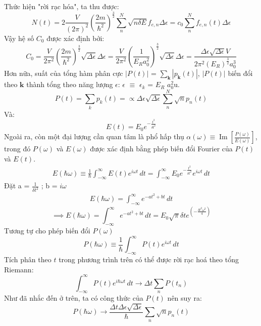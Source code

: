 \documentclass[14Pt]{article}
\begin{document}
	Thức hiện "rời rạc hóa", ta thu được:
	\begin{equation*}
		N(t) = 2 \frac{V}{(2\pi)^2} (\frac{2m}{\hbar^2})^\frac{3}{2} \sum_n^N \sqrt{n\delta E} f_{e,n} \Delta \epsilon
		= c_0 \sum_n^N f_{e,n}(t) \Delta \epsilon
	\end{equation*}
	Vậy hệ số $C_0$ được xác định bởi:
	\begin{equation}
		C_0 = \frac{V}{2\pi^2} (\frac{2m}{\hbar^2})^\frac{3}{2} \sqrt{\Delta \epsilon} \Delta \epsilon
		= \frac{V}{2\pi^2} (\frac{1}{E_R a_0^2})^\frac{3}{2}  \sqrt{\Delta \epsilon} \Delta \epsilon
		= \frac{\Delta \epsilon \sqrt{\Delta \epsilon}V}{2\pi^2 (E_R)^\frac{3}{2} a_0^3}
	\end{equation}
	Hơn nữa, suất của tổng hàm phân cực $\left| P(t) \right|$ = $\sum_\mathbf{k}$$\left| p_\mathbf{k}(t)\right|$, $\left| P(t) \right|$ biến đổi theo $\mathbf{k}$ thành tổng theo năng lượng $\epsilon$: $\epsilon$ $\equiv$ $\epsilon_k$ = $E_R$ $a_0^2$u.
	\begin{equation}
		P(t) = \sum_k p_k(t) = \propto \Delta \epsilon \sqrt{\Delta \epsilon} \sum_n^N \sqrt{n} p_n(t)
	\end{equation}
	Và:
	\begin{equation}
		E(t) = E_0 e^{-\frac{t^2}{\delta t^2}}
	\end{equation}
	Ngoài ra, còn một đại lượng cần quan tâm là phổ hấp thụ \( \alpha(\omega) \equiv \operatorname{Im} \left[\frac{P(\omega)}{E(\omega)}\right] \), trong đó \( P(\omega) \) và \( E(\omega) \) được xác định bằng phép biến đổi Fourier của \( P(t) \) và \( E(t) \).
	\begin{equation*}
		\begin{aligned}
		E(\hbar \omega) \equiv \frac{1}{\hbar}\int_{-\infty}^{\infty} E(t) e^{i\omega t} \, dt = \int_{-\infty}^{\infty}  E_0 e^{-\frac{t^2}{\delta t^2}} e^{i\omega t} \, dt
		\end{aligned}
	\end{equation*}
	Đặt a = $\frac{1}{\delta t^2}$ ; b = $i\omega$
	\begin{align*}
			E(\hbar \omega) = \int_{-\infty}^{\infty} e^{-at^2 + bt} \, dt
	\end{align*}
	\begin{equation}
	\implies E(\hbar \omega) = \int_{-\infty}^{\infty} e^{-at^2 + bt} \, dt = E_0 \sqrt{\pi} \delta t e^{\left( -\frac{\delta t^2 \omega^2}{4} \right)}
	\end{equation}
	Tương tự cho phép biến đổi $P(\omega)$
	\begin{equation}
		P(\hbar \omega) \equiv \frac{1}{\hbar}\int_{-\infty}^{\infty} P(t) e^{i\omega t} \, dt
	\end{equation}
	Tích phân theo $t$ trong phương trình trên có thể được rời rạc hoá theo tổng Riemann:
	\begin{equation*}
	\int_{-\infty}^{\infty} P(t) e^{i\hbar \omega t} \, dt \rightarrow \Delta t \sum_n P(t_n)
	\end{equation*}
	Như đã nhắc đến ở trên, ta có công thức của $P(t)$ nên suy ra:
	\begin{equation}
		P(\hbar \omega) \rightarrow \frac{\Delta t \Delta \epsilon \sqrt{\Delta \epsilon}}{\hbar}\sum_n \sqrt{n} p_n(t)
	\end{equation}
\end{document}
